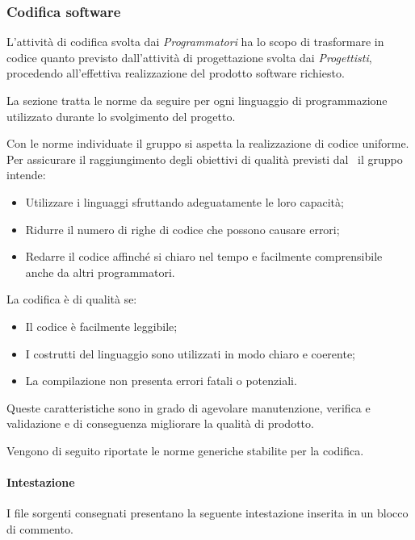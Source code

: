 \subsubsection{Codifica software}
L'attività di codifica svolta dai \textit{Programmatori} ha lo scopo di trasformare in codice quanto previsto dall'attività di progettazione svolta dai \textit{Progettisti}, procedendo all'effettiva realizzazione del prodotto software richiesto.

La sezione tratta le norme da seguire per ogni linguaggio di programmazione utilizzato durante lo svolgimento del progetto.

\label{AspettativeCodifica}Con le norme individuate il gruppo si aspetta la realizzazione di codice uniforme. Per assicurare il raggiungimento degli obiettivi di qualità previsti dal \PdQ\ il gruppo intende:
\begin{itemize}
	\item Utilizzare i linguaggi sfruttando adeguatamente le loro capacità;
	\item Ridurre il numero di righe di codice che possono causare errori;
	\item Redarre il codice affinché si chiaro nel tempo e facilmente comprensibile anche da altri programmatori.
\end{itemize}

La codifica è di qualità se: 
\begin{itemize}
	\item Il codice è facilmente leggibile;
	\item I costrutti del linguaggio sono utilizzati in modo chiaro e coerente;
	\item La compilazione non presenta errori fatali o potenziali.
\end{itemize}
Queste caratteristiche sono in grado di agevolare manutenzione, verifica e validazione e di conseguenza migliorare la qualità di prodotto.

\label{CodificaConvenzioni}
Vengono di seguito riportate le norme generiche stabilite per la codifica.
\paragraph*{Intestazione}
I file sorgenti consegnati presentano la seguente intestazione inserita in un blocco di commento.
